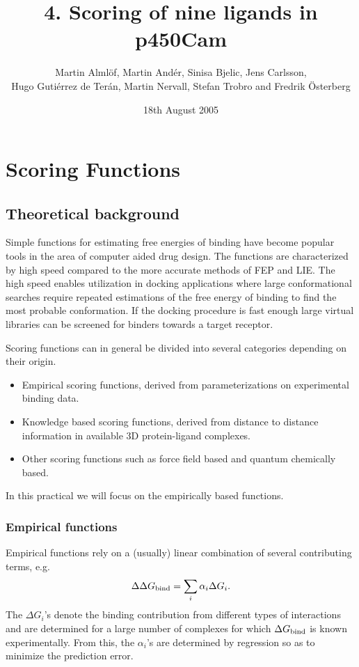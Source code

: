 \documentclass[a4paper,12pt]{article}
\title{4. Scoring of nine ligands in p450Cam}
\author{Martin Alml\"{o}f, Martin And\'er, Sinisa Bjelic, Jens Carlsson, \\ Hugo Guti\'errez de Ter\'an, Martin Nervall, Stefan Trobro and Fredrik \"{O}sterberg}
\date{18th August 2005}
\newcommand{\dGb}{\ensuremath{\Delta G_{\rm bind}}}
\begin{document}
\maketitle
\tableofcontents
\newpage
\renewcommand{\thefigure}{\arabic{figure}}

\section{Scoring Functions}

\subsection{Theoretical background}
Simple functions for estimating free energies of binding have
become popular tools in the area of computer aided drug design.
The functions are characterized by high speed compared to the more
accurate methods of FEP and LIE. The high speed enables
utilization in docking applications where large conformational
searches require repeated estimations of the free energy of
binding to find the most probable conformation. If the docking
procedure is fast enough large virtual libraries can be screened
for binders towards a target receptor.

Scoring functions can in general be divided into several
categories depending on their origin.

\begin{itemize}
\item Empirical scoring functions, derived from parameterizations on
experimental binding data.

\item Knowledge based scoring functions, derived from distance to
distance information in available 3D protein-ligand complexes.

\item Other scoring functions such as force field based and
quantum chemically based.
\end{itemize}

\noindent In this practical we will focus on the empirically based
functions.


\subsubsection{Empirical functions}
Empirical functions rely on a (usually) linear combination of
several contributing terms, e.g.
        \begin{equation} \label{emp_gen}
        \Delta \dGb = \sum_{i} \alpha_i \Delta G_{i}.
        \end{equation}
The $\Delta G_i$'s denote the binding contribution from different
types of interactions and are determined for a large number of
complexes for which {\dGb} is known experimentally. From this, the
$\alpha_i$'s are determined by regression so as to minimize the
prediction error.
\end{document}

